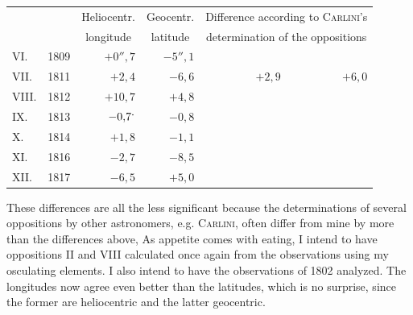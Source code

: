 \begin{center}
\begingroup\small\setlength{\tabcolsep}{5pt}
\begin{tabular}{@{}lr r r r r@{}}
&&\multicolumn{1}{c}{Heliocentr.}&\multicolumn{1}{c}{Geocentr.}&\multicolumn{2}{c}{Difference according to \textsc{Carlini}'s}\\
&&\multicolumn{1}{c}{longitude}&\multicolumn{1}{c}{latitude}&\multicolumn{2}{c}{determination of the oppositions}\\[3pt]
VI.&1809&\(+0''{,}7\)&\(-5''{,}1\)&&\\
VII.&1811&\(+2{,}4\)&\(-6{,}6\)&\(+2{,}9\)&\(+6{,}0\)\\
VIII.&1812&\(+10{,}7\)&\(+4{,}8\)&&\\
IX.&1813&\(-0{,}7\mathpunct{\raisebox{1ex}{.}}\)&\(-0{,}8\)&&\\
X.&1814&\(+1{,}8\)&\(-1{,}1\)&&\\
XI.&1816&\(-2{,}7\)&\(-8{,}5\)&&\\
XII.&1817&\(-6{,}5\)&\(+5{,}0\)&&
\end{tabular}
\endgroup
\end{center}
\par These differences are all the less significant because the determinations of several oppositions by other astronomers, e.g. \textsc{Carlini}, often differ from mine by more than the differences above, As appetite comes with eating, I intend to have oppositions II and VIII calculated once again from the observations using my osculating elements. I also intend to have the observations of 1802 analyzed. The longitudes now agree even better than the latitudes, which is no surprise, since the former are heliocentric and the latter geocentric.
\par
